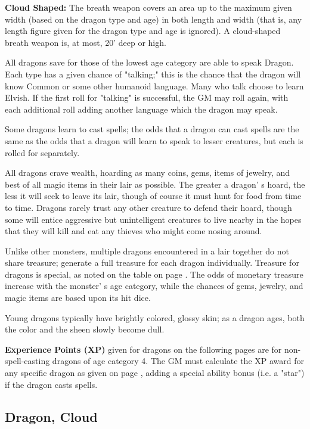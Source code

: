 \documentclass[a4paper,twoside,openany,10pt]{book}
\begin{document}
\begin{multicols}{2}
\textbf{Cloud Shaped:} The breath weapon covers an area up to the maximum given width (based on the dragon type and age) in both length and width (that is, any length figure given for the dragon type and age is ignored). A cloud-shaped breath weapon is, at most, 20' deep or high.

All dragons save for those of the lowest age category are able to speak Dragon. Each type has a given chance of "talking;" this is the chance that the dragon will know Common or some other humanoid language. Many who talk choose to learn Elvish. If the first roll for "talking" is successful, the GM may roll again, with each additional roll adding another language which the dragon may speak.

Some dragons learn to cast spells; the odds that a dragon can cast spells are the same as the odds that a dragon will learn to speak to lesser creatures, but each is rolled for separately.

All dragons crave wealth, hoarding as many coins, gems, items of jewelry, and best of all magic items in their lair as possible. The greater a dragon' s hoard, the less it will seek to leave its lair, though of course it must hunt for food from time to time. Dragons rarely trust any other creature to defend their hoard, though some will entice aggressive but unintelligent creatures to live nearby in the hopes that they will kill and eat any thieves who might come nosing around.

Unlike other monsters, multiple dragons encountered in a lair together do not share treasure; generate a full treasure for each dragon individually. Treasure for dragons is special, as noted on the table on page \hyperlink{treasure-types}{\pageref{treasure-types}}. The odds of monetary treasure increase with the monster' s age category, while the chances of gems, jewelry, and magic items are based upon its hit dice.

Young dragons typically have brightly colored, glossy skin; as a dragon ages, both the color and the sheen slowly become dull.

\textbf{Experience Points (XP)} given for dragons on the following pages are for non-spell-casting dragons of age category 4. The GM must calculate the XP award for any specific dragon as given on page \hyperlink{experience-points-xp}{\pageref{experience-points-xp}}, adding a special ability bonus (i.e. a "star") if the dragon casts spells.

\subsection*{Dragon, Cloud}\label{dragon-cloud}


\end{multicols}
\end{document}
